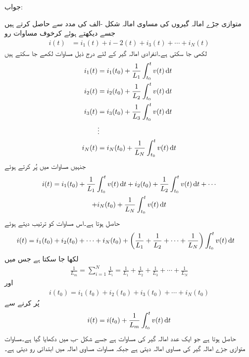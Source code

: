 جواب:

متوازی جڑے امالہ گیروں کی مساوی امالہ شکل -الف کی مدد سے حاصل کرتے ہیں جسے دیکھتے ہوئے کرخوف مساوات رو
\begin{align}\label{مساوات_امالہ_متوازی_امالہ_کرخوف_مساوات_الف}
i(t)&=i_1(t)+i-2(t)+i_3(t)+\cdots+i_N(t)
\end{align}
لکھی جا سکتی ہے۔انفرادی امالہ گیر کے لئے درج ذیل مساوات لکھے جا سکتے ہیں
\begin{align*}
i_1(t)&=i_1(t_0)+\frac{1}{L_1}\int_{t_0}^{t} v(t) \dif t\\
i_2(t)&=i_2(t_0)+\frac{1}{L_2}\int_{t_0}^{t} v(t) \dif t\\
i_3(t)&=i_3(t_0)+\frac{1}{L_3}\int_{t_0}^{t} v(t) \dif t\\
&\vdots\\
i_N(t)&=i_N(t_0)+\frac{1}{L_N}\int_{t_0}^{t} v(t) \dif t
\end{align*}
جنہیں مساوات  میں پُر کرتے ہوئے
\begin{multline*}
i(t)=i_1(t_0)+\frac{1}{L_1}\int_{t_0}^{t} v(t) \dif t+i_2(t_0)+\frac{1}{L_2}\int_{t_0}^{t} v(t) \dif t+\cdots \\
+i_N(t_0)+\frac{1}{L_N}\int_{t_0}^{t} v(t) \dif t
\end{multline*}
حاصل ہوتا ہے۔اس مساوات کو ترتیب دیتے ہوئے
\begin{align*}
i(t)&=i_1(t_0)+i_2(t_0)+\cdots+i_N(t_0)+\left(\frac{1}{L_1}+\frac{1}{L_2}+\cdots+\frac{1}{L_N}\right)\int_{t_0}^{t} v(t)\dif t
\end{align*}
لکھا جا سکتا ہے جس میں 
\begin{align}\label{مساوات_امالہ_متوازی_مساوی_مساوات_قیمت}
\frac{1}{L_m}=\sum_{i=1}^{N}\frac{1}{L_i}=\frac{1}{L_1}+\frac{1}{L_2}+\frac{1}{L_3}+\cdots+\frac{1}{L_N}
\end{align}
اور
\begin{align}\label{مساوات_امالہ_متوازی_امالہ_ابتدائی_رو}
i(t_0)=i_1(t_0)+i_2(t_0)+i_3(t_0)+\cdots+i_N(t_0)
\end{align}
پُر کرنے سے
\begin{align*}
i(t)=i(t_0)+\frac{1}{L_m}\int_{t_0}^{t} v(t) \dif t
\end{align*}
حاصل ہوتا ہے جو ایک عدد امالہ گیر کی مساوات ہے جسے شکل -ب میں دکھایا گیا ہے۔مساوات  متوازی جڑے امالہ گیر کی مساوی امالہ  دیتی ہے جبکہ مساوات  مساوی امالہ میں ابتدائی رو  دیتی ہے۔
